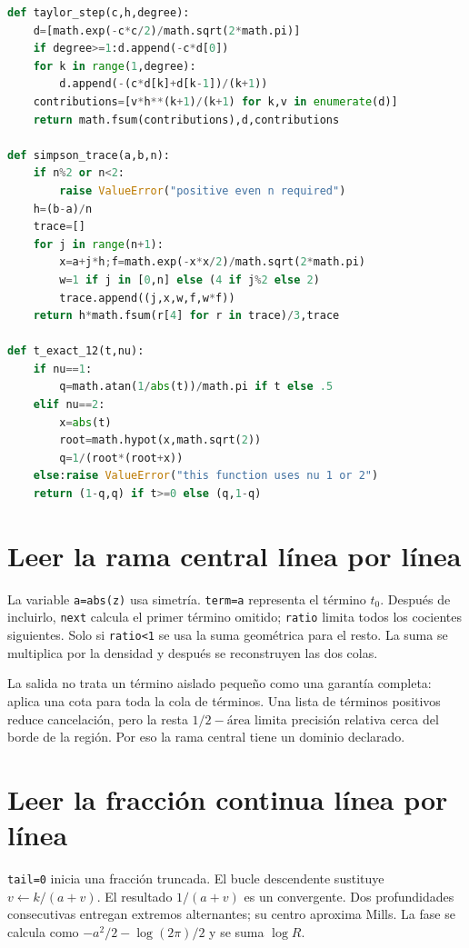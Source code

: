 \documentclass[11pt,a4paper]{article}
\theoremstyle{definition}
\begin{document}
\begin{lstlisting}[language=Python]
def taylor_step(c,h,degree):
    d=[math.exp(-c*c/2)/math.sqrt(2*math.pi)]
    if degree>=1:d.append(-c*d[0])
    for k in range(1,degree):
        d.append(-(c*d[k]+d[k-1])/(k+1))
    contributions=[v*h**(k+1)/(k+1) for k,v in enumerate(d)]
    return math.fsum(contributions),d,contributions

def simpson_trace(a,b,n):
    if n%2 or n<2:
        raise ValueError("positive even n required")
    h=(b-a)/n
    trace=[]
    for j in range(n+1):
        x=a+j*h;f=math.exp(-x*x/2)/math.sqrt(2*math.pi)
        w=1 if j in [0,n] else (4 if j%2 else 2)
        trace.append((j,x,w,f,w*f))
    return h*math.fsum(r[4] for r in trace)/3,trace

def t_exact_12(t,nu):
    if nu==1:
        q=math.atan(1/abs(t))/math.pi if t else .5
    elif nu==2:
        x=abs(t)
        root=math.hypot(x,math.sqrt(2))
        q=1/(root*(root+x))
    else:raise ValueError("this function uses nu 1 or 2")
    return (1-q,q) if t>=0 else (q,1-q)


\end{lstlisting}
\section{Leer la rama central línea por línea}
La variable \texttt{a=abs(z)} usa simetría. \texttt{term=a} representa el término $t_0$. Después de incluirlo, \texttt{next} calcula el primer término omitido; \texttt{ratio} limita todos los cocientes siguientes. Solo si \texttt{ratio<1} se usa la suma geométrica para el resto. La suma se multiplica por la densidad y después se reconstruyen las dos colas.

La salida no trata un término aislado pequeño como una garantía completa: aplica una cota para toda la cola de términos. Una lista de términos positivos reduce cancelación, pero la resta $1/2-\text{área}$ limita precisión relativa cerca del borde de la región. Por eso la rama central tiene un dominio declarado.

\section{Leer la fracción continua línea por línea}
\texttt{tail=0} inicia una fracción truncada. El bucle descendente sustituye $v\leftarrow k/(a+v)$. El resultado $1/(a+v)$ es un convergente. Dos profundidades consecutivas entregan extremos alternantes; su centro aproxima Mills. La fase se calcula como $-a^2/2-\log(2\pi)/2$ y se suma $\log R$.
\end{document}

